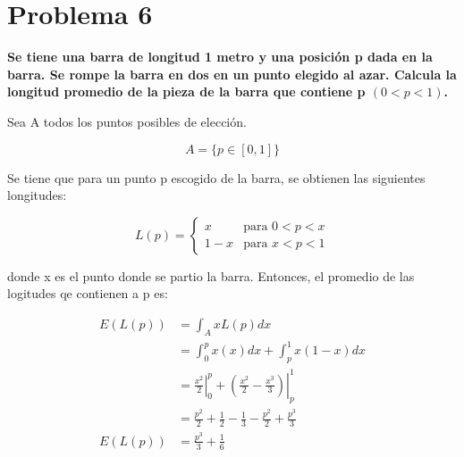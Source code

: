 \section*{Problema 6}

\textbf{Se tiene una barra de longitud 1 metro y una posición p dada en la barra. Se rompe la barra en dos en un punto elegido al azar. Calcula la longitud promedio de la pieza de la barra que contiene p $(0 < p < 1)$.}

Sea A todos los puntos posibles de elección.

\begin{equation*}
    A=\{p \in [0,1] \}
\end{equation*}

Se tiene que para un punto p escogido de la barra, se obtienen las siguientes longitudes:

\begin{equation*}
    L(p) = \begin{cases}
        x   & \text{para }  0<p<x \\
        1-x & \text{para }  x<p<1
    \end{cases}
\end{equation*}

donde x es el punto donde se partio la barra. Entonces, el promedio de las logitudes qe contienen a p es:

\begin{align*}
    E(L(p)) & = \int_A xL(p)dx                                                                               \\
            & = \int_0^p x(x)dx + \int_p^1 x(1-x)dx                                                          \\
            & = \left. \frac{x^2}{2}\right|_0^p + \left. \left(\frac{x^2}{2}-\frac{x^3}{3}\right)\right|_p^1 \\
            & = \frac{p^2}{2} + \frac{1}{2} - \frac{1}{3} - \frac{p^2}{2} + \frac{p^3}{3}                    \\
    E(L(p)) & = \frac{p^3}{3} + \frac{1}{6}
\end{align*}